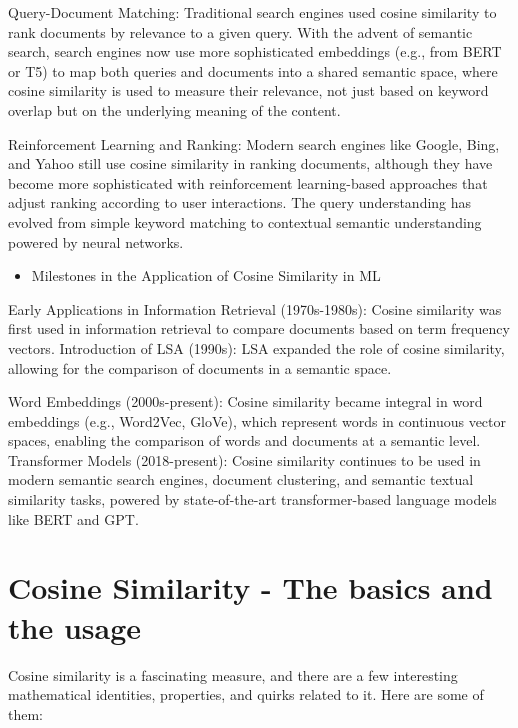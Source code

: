 \documentclass[
  12 pt,
  a4paper,
]{book}
\providecommand{\tightlist}{%
  \setlength{\itemsep}{0pt}\setlength{\parskip}{0pt}}
\numberwithin{equation}{section}
\theoremstyle{plain}      %
\theoremstyle{definition} %
\theoremstyle{remark}     %
\theoremstyle{note}         %
\begin{document}
Query-Document Matching: Traditional search engines used cosine
similarity to rank documents by relevance to a given query. With the
advent of semantic search, search engines now use more sophisticated
embeddings (e.g., from BERT or T5) to map both queries and documents
into a shared semantic space, where cosine similarity is used to measure
their relevance, not just based on keyword overlap but on the underlying
meaning of the content.

Reinforcement Learning and Ranking: Modern search engines like Google,
Bing, and Yahoo still use cosine similarity in ranking documents,
although they have become more sophisticated with reinforcement
learning-based approaches that adjust ranking according to user
interactions. The query understanding has evolved from simple keyword
matching to contextual semantic understanding powered by neural
networks.

\begin{itemize}
\tightlist
\item
  Milestones in the Application of Cosine Similarity in ML
\end{itemize}

Early Applications in Information Retrieval (1970s-1980s): Cosine
similarity was first used in information retrieval to compare documents
based on term frequency vectors. Introduction of LSA (1990s): LSA
expanded the role of cosine similarity, allowing for the comparison of
documents in a semantic space.

Word Embeddings (2000s-present): Cosine similarity became integral in
word embeddings (e.g., Word2Vec, GloVe), which represent words in
continuous vector spaces, enabling the comparison of words and documents
at a semantic level. Transformer Models (2018-present): Cosine
similarity continues to be used in modern semantic search engines,
document clustering, and semantic textual similarity tasks, powered by
state-of-the-art transformer-based language models like BERT and GPT.

\hypertarget{cosine-similarity---the-basics-and-the-usage}{%
\section{Cosine Similarity - The basics and the
usage}\label{cosine-similarity---the-basics-and-the-usage}}

Cosine similarity is a fascinating measure, and there are a few
interesting mathematical identities, properties, and quirks related to
it. Here are some of them:
\end{document}
